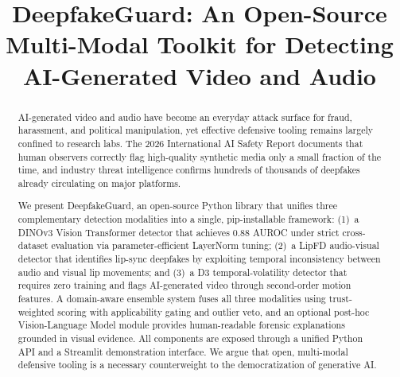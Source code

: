 \documentclass[conference]{IEEEtran}
\begin{document}
\title{DeepfakeGuard: An Open-Source Multi-Modal Toolkit for Detecting AI-Generated Video and Audio}

\author{
}
\maketitle


\begin{abstract}
AI-generated video and audio have become an everyday attack surface for fraud, harassment, and political manipulation, yet effective defensive tooling remains largely confined to research labs. The 2026 International AI Safety Report documents that human observers correctly flag high-quality synthetic media only a small fraction of the time, and industry threat intelligence confirms hundreds of thousands of deepfakes already circulating on major platforms.

We present DeepfakeGuard, an open-source Python library that unifies three complementary detection modalities into a single, pip-installable framework: (1)~a DINOv3 Vision Transformer detector that achieves 0.88 AUROC under strict cross-dataset evaluation via parameter-efficient LayerNorm tuning; (2)~a LipFD audio-visual detector that identifies lip-sync deepfakes by exploiting temporal inconsistency between audio and visual lip movements; and (3)~a D3 temporal-volatility detector that requires zero training and flags AI-generated video through second-order motion features. A domain-aware ensemble system fuses all three modalities using trust-weighted scoring with applicability gating and outlier veto, and an optional post-hoc Vision-Language Model module provides human-readable forensic explanations grounded in visual evidence. All components are exposed through a unified Python API and a Streamlit demonstration interface. We argue that open, multi-modal defensive tooling is a necessary counterweight to the democratization of generative AI.
\end{abstract}
\end{document}
